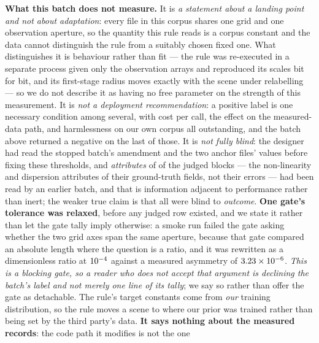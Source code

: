\documentclass[review]{elsarticle}
\begin{document}
\textbf{What this batch does not measure.} It is \emph{a statement about a landing
point and not about adaptation}: every file in this corpus shares one grid and one
observation aperture, so the quantity this rule reads is a corpus constant and the
data cannot distinguish the rule from a suitably chosen fixed one. What distinguishes
it is behaviour rather than fit --- the rule was re-executed in a separate process
given only the observation arrays and reproduced its scales bit for bit, and its
first-stage radius moves exactly with the scene under relabelling --- so we do not
describe it as having no free parameter on the strength of this measurement. It is
\emph{not a deployment recommendation}: a positive label is one necessary condition
among several, with cost per call, the effect on the measured-data path, and
harmlessness on our own corpus all outstanding, and the batch above returned a
negative on the last of those. It is \emph{not fully blind}: the designer had read
the stopped batch's amendment and the two anchor files' values before fixing these
thresholds, and \emph{attributes} of \TSixteenAttrExposed{} of the \TSixteenN{} judged
blocks --- the non-linearity and dispersion attributes of their ground-truth fields,
not their errors --- had been read by an earlier batch, and that is information
adjacent to performance rather than inert;
the weaker true claim is that all \TSixteenN{} were blind to \emph{outcome}. \textbf{One gate's tolerance was relaxed}, before any judged row
existed, and we state it rather than let the gate tally imply otherwise: a smoke run
failed the gate asking whether the two grid axes span the same aperture, because that
gate compared an absolute length where the question is a ratio, and it was rewritten
as a dimensionless ratio at $10^{-4}{}$ against a measured asymmetry of
$3.23\times 10^{-6}{}$.
\emph{This is a blocking gate, so a reader who does not accept that argument is
declining the batch's label and not merely one line of its tally}; we say so rather
than offer the gate as detachable. The rule's target
constants come from \emph{our} training distribution, so the rule moves a scene to
where our prior was trained rather than being set by the third party's data. \textbf{It
says nothing about the measured records}: the code path it modifies is not the one
\end{document}
